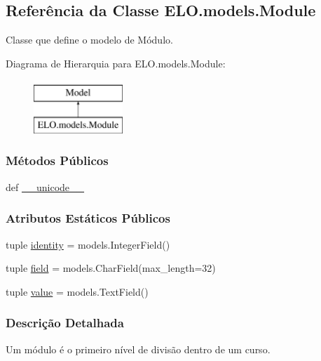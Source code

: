 \hypertarget{classELO_1_1models_1_1Module}{\subsection{Referência da Classe E\-L\-O.\-models.\-Module}
\label{classELO_1_1models_1_1Module}
}


Classe que define o modelo de Módulo.  


Diagrama de Hierarquia para E\-L\-O.\-models.\-Module\-:\begin{figure}[H]
\begin{center}
\leavevmode
\includegraphics[height=2.000000cm]{d1/d5d/classELO_1_1models_1_1Module}
\end{center}
\end{figure}
\subsubsection*{Métodos Públicos}
\begin{DoxyCompactItemize}
\item 
def \hyperlink{classELO_1_1models_1_1Module_a1b54aa7a5e8dac090dea0926eca5550d}{\-\_\-\-\_\-unicode\-\_\-\-\_\-}
\end{DoxyCompactItemize}
\subsubsection*{Atributos Estáticos Públicos}
\begin{DoxyCompactItemize}
\item 
tuple \hyperlink{classELO_1_1models_1_1Module_abbf09409159a27a42ea6cb33fcc7fde7}{identity} = models.\-Integer\-Field()
\item 
tuple \hyperlink{classELO_1_1models_1_1Module_ad05ba106a7012cd72877fe21e8639e2d}{field} = models.\-Char\-Field(max\-\_\-length=32)
\item 
tuple \hyperlink{classELO_1_1models_1_1Module_a5b31cea93dea5474f3ff974cd745e39f}{value} = models.\-Text\-Field()
\end{DoxyCompactItemize}


\subsubsection{Descrição Detalhada}
Um módulo é o primeiro nível de divisão dentro de um curso.

